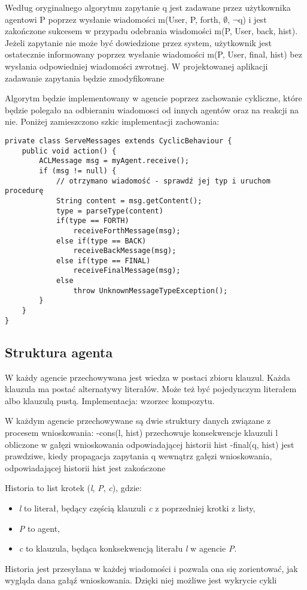 \documentclass[a4paper,12pt]{mwart}
\begin{document}
Według oryginalnego algorytmu zapytanie q jest zadawane przez użytkownika agentowi P poprzez wysłanie wiadomości m(User, P, forth, $\emptyset$, $\neg$q) i jest zakończone sukcesem w przypadu odebrania wiadomości m(P, User, back, hist). Jeżeli zapytanie nie może być dowiedzione przez system, użytkownik jest ostatecznie informowany poprzez wysłanie wiadomości m(P, User, final, hist) bez wysłania odpowiedniej wiadomości zwrotnej. W projektowanej aplikacji zadawanie zapytania będzie zmodyfikowane

Algorytm będzie implementowany w agencie poprzez zachowanie cykliczne, które będzie polegało na odbieraniu wiadomosci od innych agentów oraz na reakcji na nie. Poniżej zamieszczono szkic implementacji zachowania:
\begin{verbatim}
private class ServeMessages extends CyclicBehaviour {
    public void action() {
        ACLMessage msg = myAgent.receive();
        if (msg != null) {
            // otrzymano wiadomość - sprawdź jej typ i uruchom procedurę
            String content = msg.getContent();
            type = parseType(content)
            if(type == FORTH)
                receiveForthMessage(msg);
            else if(type == BACK)
                receiveBackMessage(msg);
            else if(type == FINAL)
                receiveFinalMessage(msg);
            else
                throw UnknownMessageTypeException();
        }
    }
}
\end{verbatim}
\subsection{Struktura agenta}
W każdy agencie przechowywana jest wiedza w postaci zbioru klauzul.
Każda klauzula ma postać alternatywy literałów. Może też być pojedynczym literałem albo klauzulą pustą.
Implementacja: wzorzec kompozytu.

W każdym agencie przechowywane są dwie struktury danych związane z procesem wnioskowania:
-cons(l, hist) przechowuje konsekwencje klauzuli l obliczone w gałęzi wnioskowania odpowiadającej historii hist
-final(q, hist) jest prawdziwe, kiedy propagacja zapytania q wewnątrz gałęzi wnioskowania, odpowiadającej historii hist jest zakończone

Historia to list krotek (\textit{l}, \textit{P}, \textit{c}), gdzie:
\begin{itemize}
\item \textit{l} to literał, będący częścią klauzuli \textit{c} z poprzedniej krotki z listy,
\item \textit{P} to agent,
\item \textit{c} to klauzula, będąca konksekwencją literału \textit{l} w agencie \textit{P}.
\end{itemize}
Historia jest przesyłana w każdej wiadomości i pozwala ona się zorientować, jak wygląda dana gałąź wnioskowania. Dzięki niej możliwe jest wykrycie cykli
\end{document}
